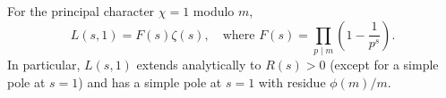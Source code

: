 For the principal character $\chi = 1$ modulo $m$,
$$
L(s,1) = F(s)\zeta(s), \quad \text{where } F(s) = \prod_{p \mid m} \left(1 - \frac{1}{p^s}\right).
$$
In particular, $L(s,1)$ extends analytically to $R(s) > 0$ (except for a simple pole at $s=1$) and has a simple pole at $s=1$ with residue $\phi(m)/m$.
